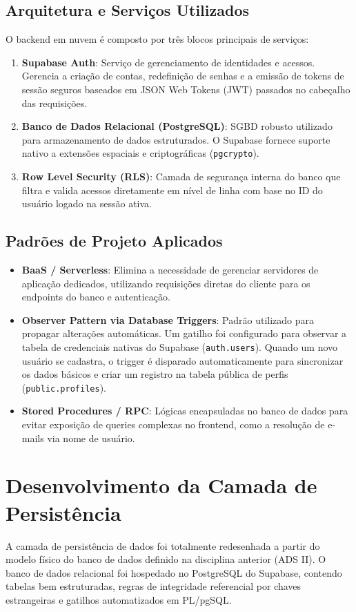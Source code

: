 \documentclass[12pt,a4paper]{article}
\begin{document}
\subsection{Arquitetura e Serviços Utilizados}
O backend em nuvem é composto por três blocos principais de serviços:
\begin{enumerate}
    \item \textbf{Supabase Auth}: Serviço de gerenciamento de identidades e acessos. Gerencia a criação de contas, redefinição de senhas e a emissão de tokens de sessão seguros baseados em JSON Web Tokens (JWT) passados no cabeçalho das requisições.
    \item \textbf{Banco de Dados Relacional (PostgreSQL)}: SGBD robusto utilizado para armazenamento de dados estruturados. O Supabase fornece suporte nativo a extensões espaciais e criptográficas (\texttt{pgcrypto}).
    \item \textbf{Row Level Security (RLS)}: Camada de segurança interna do banco que filtra e valida acessos diretamente em nível de linha com base no ID do usuário logado na sessão ativa.
\end{enumerate}

\subsection{Padrões de Projeto Aplicados}
\begin{itemize}
    \item \textbf{BaaS / Serverless}: Elimina a necessidade de gerenciar servidores de aplicação dedicados, utilizando requisições diretas do cliente para os endpoints do banco e autenticação.
    \item \textbf{Observer Pattern via Database Triggers}: Padrão utilizado para propagar alterações automáticas. Um gatilho foi configurado para observar a tabela de credenciais nativas do Supabase (\texttt{auth.users}). Quando um novo usuário se cadastra, o trigger é disparado automaticamente para sincronizar os dados básicos e criar um registro na tabela pública de perfis (\texttt{public.profiles}).
    \item \textbf{Stored Procedures / RPC}: Lógicas encapsuladas no banco de dados para evitar exposição de queries complexas no frontend, como a resolução de e-mails via nome de usuário.
\end{itemize}

\section{Desenvolvimento da Camada de Persistência}
A camada de persistência de dados foi totalmente redesenhada a partir do modelo físico do banco de dados definido na disciplina anterior (ADS II). O banco de dados relacional foi hospedado no PostgreSQL do Supabase, contendo tabelas bem estruturadas, regras de integridade referencial por chaves estrangeiras e gatilhos automatizados em PL/pgSQL.
\end{document}
